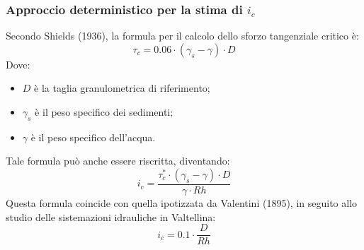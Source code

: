 \subsubsection{Approccio deterministico per la stima di $i_c$}
Secondo Shields (1936), la formula per il calcolo dello sforzo tangenziale critico è:
\begin{equation}
    \tau_c = 0.06 \cdot (\gamma_s -\gamma) \cdot D
\end{equation}
Dove:
\begin{itemize}
   \item $D$ è la taglia granulometrica di riferimento;
    \item $\gamma_s$ è il peso specifico dei sedimenti;
    \item $\gamma$ è il peso specifico dell'acqua.
\end{itemize}
Tale formula può anche essere riscritta, diventando:
\begin{equation}
    i_c = \frac{\tau_c^* \cdot (\gamma_s-\gamma) \cdot D}{\gamma \cdot Rh}
\end{equation}
Questa formula coincide con quella ipotizzata da Valentini (1895), in seguito allo studio delle sistemazioni idrauliche in Valtellina:
\begin{equation}
    i_c = 0.1 \cdot \frac{D}{Rh}
\end{equation}
